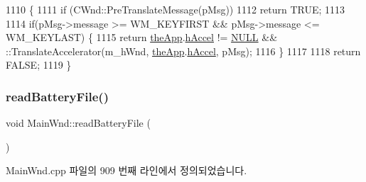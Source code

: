\begin{DoxyCode}
1110 \{
1111   \textcolor{keywordflow}{if} (CWnd::PreTranslateMessage(pMsg))
1112     \textcolor{keywordflow}{return} TRUE;
1113 
1114   \textcolor{keywordflow}{if}(pMsg->message >= WM\_KEYFIRST && pMsg->message <= WM\_KEYLAST) \{
1115     \textcolor{keywordflow}{return} \mbox{\hyperlink{_v_b_a_8cpp_a8095a9d06b37a7efe3723f3218ad8fb3}{theApp}}.\mbox{\hyperlink{class_v_b_a_a6ca8052bfc1574a9ef8ca4482563e1e3}{hAccel}} != \mbox{\hyperlink{getopt1_8c_a070d2ce7b6bb7e5c05602aa8c308d0c4}{NULL}} &&  ::TranslateAccelerator(m\_hWnd, 
      \mbox{\hyperlink{_v_b_a_8cpp_a8095a9d06b37a7efe3723f3218ad8fb3}{theApp}}.\mbox{\hyperlink{class_v_b_a_a6ca8052bfc1574a9ef8ca4482563e1e3}{hAccel}}, pMsg);
1116   \}
1117   
1118   \textcolor{keywordflow}{return} FALSE;
1119 \}
\end{DoxyCode}
\mbox{\label{class_main_wnd_a6f37e1bbcd8c635131b84ded2786578b}} 
\subsubsection{\texorpdfstring{read\+Battery\+File()}{readBatteryFile()}}
{\footnotesize\ttfamily void Main\+Wnd\+::read\+Battery\+File (\begin{DoxyParamCaption}{ }\end{DoxyParamCaption})}



Main\+Wnd.\+cpp 파일의 909 번째 라인에서 정의되었습니다.


